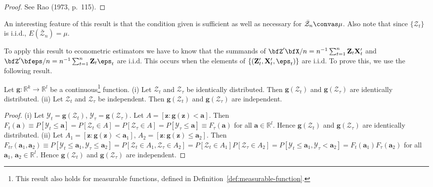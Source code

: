 \begin{proof}
See Rao (1973, p.~115). \qedhere
\end{proof}

An interesting feature of this result is that the condition given is sufficient as well as necessary for $\bar{\mathcal{Z}}_n \convas \mu$. Also note that since $\{\mathcal{Z}_t\}$ is i.i.d., $E(\bar{\mathcal{Z}}_n) = \mu$.

To apply this result to econometric estimators we have to know that the summands of $\bfZ'\bfX/n = n^{-1} \sum_{t=1}^{n} \mathbf{Z}_t \mathbf{X}_t'$ and $\bfZ'\bfeps/n = n^{-1} \sum_{t=1}^{n} \mathbf{Z}_t \eps_t$ are i.i.d. This occurs when the elements of $\{(\mathbf{Z}_t', \mathbf{X}_t', \eps_t)\}$ are i.i.d. To prove this, we use the following result.

\begin{proposition}\label{prop:continuous-iid}
Let $\mathbf{g} : \mathbb{R}^k \to \mathbb{R}^l$ be a continuous\footnote{This result also holds for measurable functions, defined in Definition~\ref{def:measurable-function}.} function. (i) Let $\mathcal{Z}_t$ and $\mathcal{Z}_\tau$ be identically distributed. Then $\mathbf{g}(\mathcal{Z}_t)$ and $\mathbf{g}(\mathcal{Z}_\tau)$ are identically distributed. (ii) Let $\mathcal{Z}_t$ and $\mathcal{Z}_\tau$ be independent. Then $\mathbf{g}(\mathcal{Z}_t)$ and $\mathbf{g}(\mathcal{Z}_\tau)$ are independent.
\end{proposition}

\begin{proof}
(i) Let $\mathcal{Y}_t = \mathbf{g}(\mathcal{Z}_t)$, $\mathcal{Y}_\tau = \mathbf{g}(\mathcal{Z}_\tau)$. Let $A = [\mathbf{z} : \mathbf{g}(\mathbf{z}) < \mathbf{a}]$. Then $F_t(\mathbf{a}) \equiv P[\mathcal{Y}_t \leq \mathbf{a}] = P[\mathcal{Z}_t \in A] = P[\mathcal{Z}_\tau \in A] = P[\mathcal{Y}_\tau \leq \mathbf{a}] \equiv F_\tau(\mathbf{a})$ for all $\mathbf{a} \in \mathbb{R}^l$. Hence $\mathbf{g}(\mathcal{Z}_t)$ and $\mathbf{g}(\mathcal{Z}_\tau)$ are identically distributed. (ii) Let $A_1 = [\mathbf{z} : \mathbf{g}(\mathbf{z}) < \mathbf{a}_1]$, $A_2 = [\mathbf{z} : \mathbf{g}(\mathbf{z}) \leq \mathbf{a}_2]$. Then $F_{t\tau}(\mathbf{a}_1, \mathbf{a}_2) \equiv P[\mathcal{Y}_t \leq \mathbf{a}_1, \mathcal{Y}_\tau \leq \mathbf{a}_2] = P[\mathcal{Z}_t \in A_1, \mathcal{Z}_\tau \in A_2] = P[\mathcal{Z}_t \in A_1] P[\mathcal{Z}_\tau \in A_2] = P[\mathcal{Y}_t \leq \mathbf{a}_1, \mathcal{Y}_\tau < \mathbf{a}_2] = F_t(\mathbf{a}_1) F_\tau(\mathbf{a}_2)$ for all $\mathbf{a}_1$, $\mathbf{a}_2 \in \mathbb{R}^l$. Hence $\mathbf{g}(\mathcal{Z}_t)$ and $\mathbf{g}(\mathcal{Z}_\tau)$ are independent. \qedhere
\end{proof}

